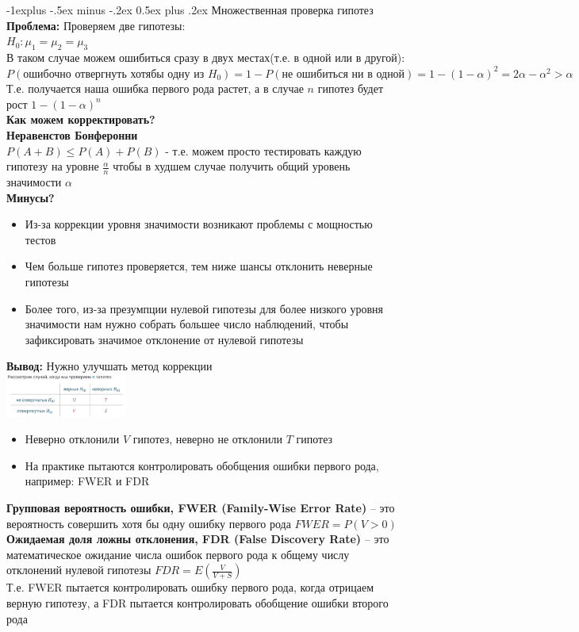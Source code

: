 \documentclass[10pt,landscape]{article}
\makeatletter
\renewcommand{\subsection}{\@startsection{subsection}{2}{0mm}%
                                {-1explus -.5ex minus -.2ex}%
                                {0.5ex plus .2ex}%
                                {\normalfont\normalsize\bfseries}}
\makeatother
\begin{document}
\begin{multicols}{3}
\subsection{Множественная проверка гипотез}
\textbf{Проблема:}
Проверяем две гипотезы:\\
$H_0: \mu_1 = \mu_2 = \mu_3$\\
В таком случае можем ошибиться сразу в двух местах(т.е. в одной или в другой):\\
$P(\text{ошибочно отвергнуть хотябы одну из } H_0) = 
1 - P(\text{не ошибиться ни в одной})  = 1 - (1-\alpha)^2 = 2\alpha - \alpha^2 > \alpha$
Т.е. получается наша ошибка первого рода растет, а в случае $n$ гипотез будет рост $1-(1-\alpha)^n$\\
\textbf{Как можем корректировать?}\\
\textbf{Неравенстов Бонферонни}\\
$P(A+B) \leq P(A) + P(B)$ - т.е. можем просто тестировать каждую гипотезу на уровне $\frac{\alpha}{n}$ чтобы в худшем случае получить общий уровень значимости $\alpha$\\
\textbf{Минусы?}\\
\begin{itemize}
    \item Из-за коррекции уровня значимости возникают проблемы с
мощностью тестов
    \item Чем больше гипотез проверяется, тем ниже шансы
отклонить неверные гипотезы
    \item Более того, из-за презумпции нулевой гипотезы для более
низкого уровня значимости нам нужно собрать большее
число наблюдений, чтобы зафиксировать значимое
отклонение от нулевой гипотезы
\end{itemize}
\textbf{Вывод:} Нужно улучшать метод коррекции\\
\includegraphics[width=0.3\textwidth]{Screenshot from 2021-09-14 10-27-21.png}
\begin{itemize}
    \item Неверно отклонили $V$ гипотез, неверно не отклонили $T$
гипотез
    \item На практике пытаются контролировать обобщения
ошибки первого рода, например: FWER и FDR
\end{itemize}
\textbf{Групповая вероятность ошибки, FWER (Family-Wise Error Rate)}
– это вероятность совершить хотя бы одну ошибку первого
рода $FWER = P(V>0)$\\
\textbf{Ожидаемая доля ложны отклонения, FDR (False Discovery
Rate) }– это математическое ожидание числа ошибок первого
рода к общему числу отклонений нулевой гипотезы $FDR = E(\frac{V}{V+S})$\\
Т.е. FWER пытается контролировать ошибку первого рода, когда отрицаем верную гипотезу, а FDR пытается контролировать обобщение ошибки второго рода

\end{multicols}
\end{document}
